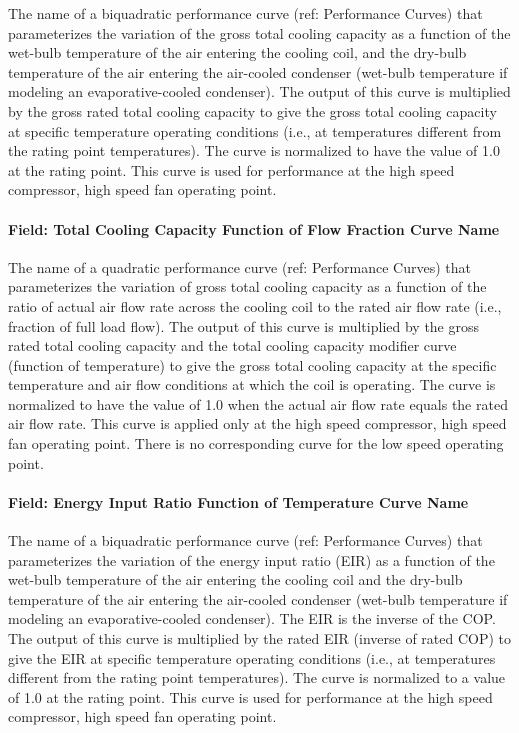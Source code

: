 The name of a biquadratic performance curve (ref: Performance Curves) that parameterizes the variation of the gross total cooling capacity as a function of the wet-bulb temperature of the air entering the cooling coil, and the dry-bulb temperature of the air entering the air-cooled condenser (wet-bulb temperature if modeling an evaporative-cooled condenser). The output of this curve is multiplied by the gross rated total cooling capacity to give the gross total cooling capacity at specific temperature operating conditions (i.e., at temperatures different from the rating point temperatures). The curve is normalized to have the value of 1.0 at the rating point. This curve is used for performance at the high speed compressor, high speed fan operating point.

\paragraph{Field: Total Cooling Capacity Function of Flow Fraction Curve Name}\label{field-total-cooling-capacity-function-of-flow-fraction-curve-name-1}

The name of a quadratic performance curve (ref: Performance Curves) that parameterizes the variation of gross total cooling capacity as a function of the ratio of actual air flow rate across the cooling coil to the rated air flow rate (i.e., fraction of full load flow). The output of this curve is multiplied by the gross rated total cooling capacity and the total cooling capacity modifier curve (function of temperature) to give the gross total cooling capacity at the specific temperature and air flow conditions at which the coil is operating. The curve is normalized to have the value of 1.0 when the actual air flow rate equals the rated air flow rate. This curve is applied only at the high speed compressor, high speed fan operating point. There is no corresponding curve for the low speed operating point.

\paragraph{Field: Energy Input Ratio Function of Temperature Curve Name}\label{field-energy-input-ratio-function-of-temperature-curve-name-1}

The name of a biquadratic performance curve (ref: Performance Curves) that parameterizes the variation of the energy input ratio (EIR) as a function of the wet-bulb temperature of the air entering the cooling coil and the dry-bulb temperature of the air entering the air-cooled condenser (wet-bulb temperature if modeling an evaporative-cooled condenser). The EIR is the inverse of the COP. The output of this curve is multiplied by the rated EIR (inverse of rated COP) to give the EIR at specific temperature operating conditions (i.e., at temperatures different from the rating point temperatures). The curve is normalized to a value of 1.0 at the rating point. This curve is used for performance at the high speed compressor, high speed fan operating point.

